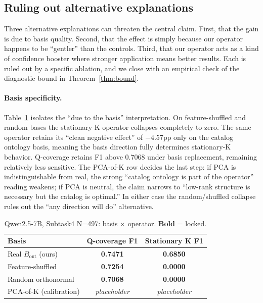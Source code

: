 \subsection{Ruling out alternative explanations}\label{sec:exp:ablations}

Three alternative explanations can threaten the central claim. First, that the gain is due to basis quality. Second, that the effect is simply because our operator happens to be ``gentler'' than the controls. Third, that our operator acts as a kind of confidence booster where stronger application means better results. Each is ruled out by a specific ablation, and we close with an empirical check of the diagnostic bound in Theorem~\ref{thm:bound}.

\paragraph{Basis specificity.}
Table~\ref{tab:e4-basis} isolates the ``due to the basis'' interpretation. On feature-shuffled and random bases the stationary K operator collapses completely to zero. The same operator retains its ``clean negative effect'' of $-4.57$pp only on the catalog ontology basis, meaning the basis direction fully determines stationary-K behavior. Q-coverage retains F1 above 0.7068 under basis replacement, remaining relatively less sensitive. The PCA-of-K row decides the last step: if PCA is indistinguishable from real, the strong ``catalog ontology is part of the operator'' reading weakens; if PCA is neutral, the claim narrows to ``low-rank structure is necessary but the catalog is optimal.'' In either case the random/shuffled collapse rules out the ``any direction will do'' alternative.

\begin{table}[t]
\centering
\caption{Qwen2.5-7B, Subtask4 N=497: basis $\times$ operator. \textbf{Bold} = locked.}
\label{tab:e4-basis}
\small
\begin{tabularx}{0.9\linewidth}{@{}Xcc@{}}
\toprule
Basis & Q-coverage F1 & Stationary K F1 \\
\midrule
Real $B_{\mathrm{ont}}$ (ours) & \textbf{0.7471} & \textbf{0.6850} \\
Feature-shuffled & \textbf{0.7254} & \textbf{0.0000} \\
Random orthonormal & \textbf{0.7068} & \textbf{0.0000} \\
PCA-of-K (calibration) & \emph{placeholder} & \emph{placeholder} \\
\bottomrule
\end{tabularx}
\end{table}

